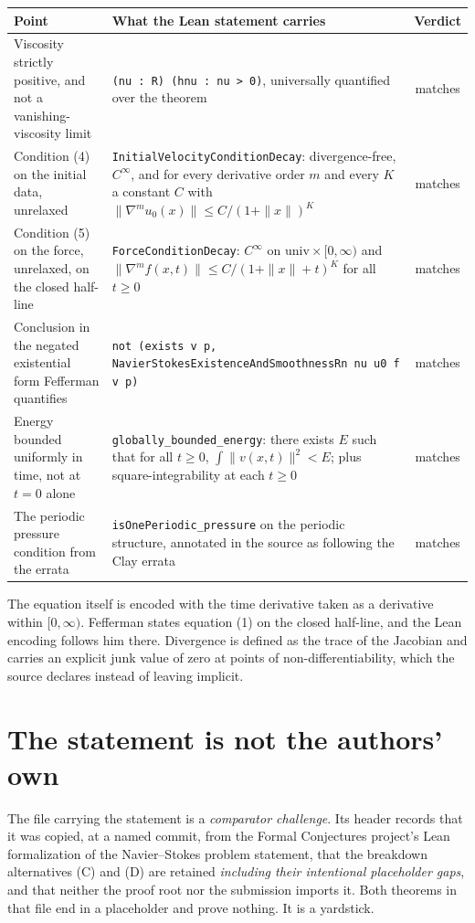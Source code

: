 \begin{center}
\begin{tabular}{@{}p{}p{}c@{}}
\toprule
Point & What the Lean statement carries & Verdict \\
\midrule
Viscosity strictly positive, and not a vanishing-viscosity limit
& \texttt{(nu : R) (hnu : nu > 0)}, universally quantified over the theorem
& matches \\[0.5em]
Condition (4) on the initial data, unrelaxed
& \texttt{InitialVelocityConditionDecay}: divergence-free, $C^\infty$, and for every derivative
order $m$ and every $K$ a constant $C$ with
$\|\nabla^m u_0(x)\| \le C/(1+\|x\|)^K$
& matches \\[0.5em]
Condition (5) on the force, unrelaxed, on the closed half-line
& \texttt{ForceConditionDecay}: $C^\infty$ on $\mathrm{univ}\times[0,\infty)$ and
$\|\nabla^m f(x,t)\| \le C/(1+\|x\|+t)^K$ for all $t\ge0$
& matches \\[0.5em]
Conclusion in the negated existential form Fefferman quantifies
& \texttt{not (exists v p, NavierStokesExistence\-AndSmoothnessRn nu u0 f v p)}
& matches \\[0.5em]
Energy bounded uniformly in time, not at $t=0$ alone
& \texttt{globally\_bounded\_energy}: there exists $E$ such that for all $t\ge0$,
$\int\|v(x,t)\|^2 < E$; plus square-integrability at each $t\ge0$
& matches \\[0.5em]
The periodic pressure condition from the errata
& \texttt{isOnePeriodic\_pressure} on the periodic structure, annotated in the source as following
the Clay errata
& matches \\
\bottomrule
\end{tabular}
\end{center}

The equation itself is encoded with the time derivative taken as a derivative within
$[0,\infty)$. Fefferman states equation (1) on the closed half-line, and the Lean encoding follows
him there. Divergence is defined as the trace of the Jacobian and carries an explicit junk value of
zero at points of non-differentiability, which the source declares instead of leaving implicit.

\section{The statement is not the authors' own}

The file carrying the statement is a \emph{comparator challenge}. Its header records that it was
copied, at a named commit, from the Formal Conjectures project's Lean formalization of the
Navier--Stokes problem statement, that the breakdown alternatives (C) and (D) are retained
\emph{including their intentional placeholder gaps}, and that neither the proof root nor the
submission imports it. Both theorems in that file end in a placeholder and prove nothing. It is a
yardstick.

